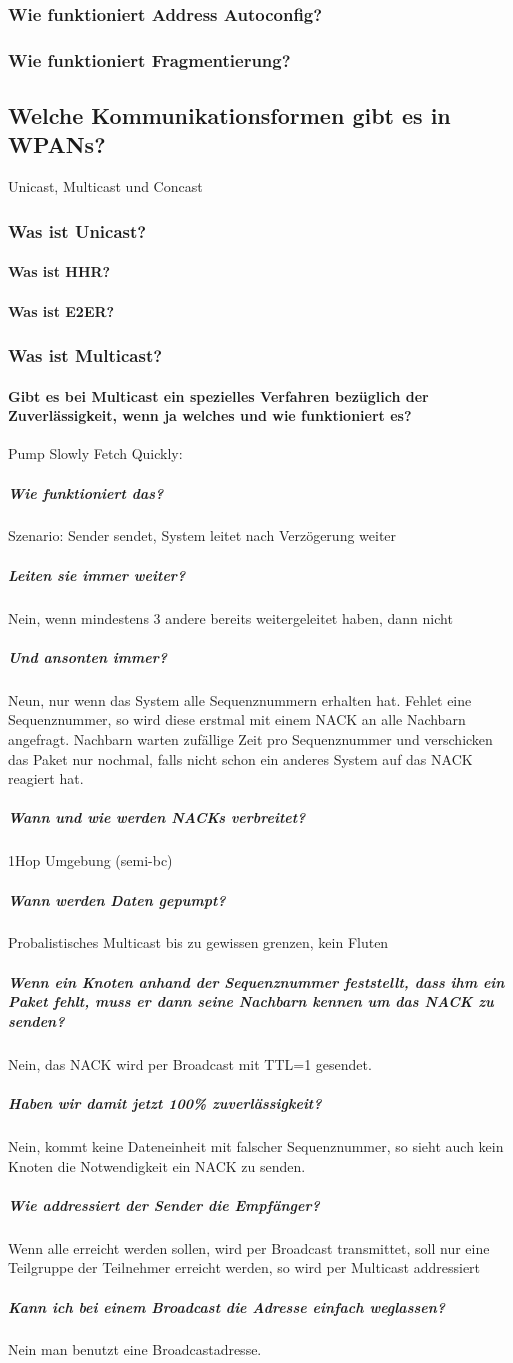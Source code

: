 		\subsubsection{Wie funktioniert Address Autoconfig?}
		\subsubsection{Wie funktioniert Fragmentierung?}
	
	\subsection{Welche Kommunikationsformen gibt es in WPANs?}
		Unicast, Multicast und Concast
		\subsubsection{Was ist Unicast?}
			\paragraph{Was ist HHR?}
			\paragraph{Was ist E2ER?}
		\subsubsection{Was ist Multicast?}
		\paragraph{Gibt es bei Multicast ein spezielles Verfahren bezüglich der Zuverlässigkeit, wenn ja welches und wie funktioniert es?}
			Pump Slowly Fetch Quickly: %
			\subparagraph{Wie funktioniert das?}
			Szenario: Sender sendet, System leitet nach Verzögerung weiter
			\subparagraph{Leiten sie immer weiter?}
			Nein, wenn mindestens 3 andere bereits weitergeleitet haben, dann nicht
			\subparagraph{Und ansonten immer?}
			Neun, nur wenn das System alle Sequenznummern erhalten hat. Fehlet eine Sequenznummer, so wird diese erstmal mit einem NACK an alle Nachbarn angefragt. Nachbarn warten zufällige Zeit pro Sequenznummer und verschicken das Paket nur nochmal, falls nicht schon ein anderes System auf das NACK reagiert hat.
			\subparagraph{Wann und wie werden NACKs verbreitet?} 1Hop Umgebung (semi-bc)
			\subparagraph{Wann werden Daten gepumpt?} Probalistisches Multicast bis zu gewissen grenzen, kein Fluten
			\subparagraph{Wenn ein Knoten anhand der Sequenznummer feststellt, dass ihm ein Paket fehlt, muss er dann seine Nachbarn kennen um das NACK zu senden?}
			Nein, das NACK wird per Broadcast mit TTL=1 gesendet.
			\subparagraph{Haben wir damit jetzt 100\% zuverlässigkeit?}
			Nein, kommt keine Dateneinheit mit falscher Sequenznummer, so sieht auch kein Knoten die Notwendigkeit ein NACK zu senden.
			\subparagraph{Wie addressiert der Sender die Empfänger?}
			Wenn alle erreicht werden sollen, wird per Broadcast transmittet, soll nur eine Teilgruppe der Teilnehmer erreicht werden, so wird per Multicast addressiert %
			\subparagraph{Kann ich bei einem Broadcast die Adresse einfach weglassen?}
			Nein man benutzt eine Broadcastadresse.
			

